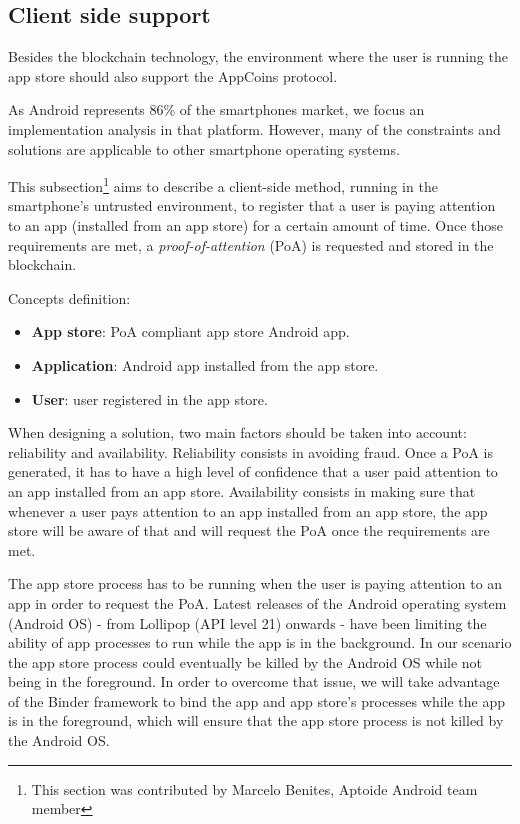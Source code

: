 \subsection{Client side support}

Besides the blockchain technology, the environment where the user is running the app store should 
also support the AppCoins protocol.


As Android represents 86\% of the smartphones market, we focus an implementation analysis in that 
platform. However, many of the constraints and solutions are applicable to other smartphone operating systems.

This subsection\footnote{This section was contributed by Marcelo Benites, Aptoide Android team 
member} aims to describe a client-side method, running in the smartphone's untrusted environment, to 
register that a user is paying attention to an app (installed from an app store) for a certain amount of time. Once those requirements are met, a \textit{proof-of-attention} (\textsf{PoA}) is requested and stored in the 
blockchain.
 
 
Concepts definition: %
\begin{itemize}
\item {\bf App store}: PoA compliant app store Android app.
\item {\bf Application}: Android app installed from the app store.
\item {\bf User}: user registered in the app store.
\end{itemize}

When designing a solution, two main factors should be taken into account: reliability and availability. 
Reliability consists in avoiding fraud. Once a \textsf{PoA} is generated, it has to have a high level of 
confidence that a user paid attention to an app installed from an app store. Availability consists in 
making sure that whenever a user pays attention to an app installed from an app store, the app store 
will be aware of that and will request the \textsf{PoA} once the requirements are met. %

The app store process has to be running when the user is paying attention to an app in order to request  
the \textsf{PoA}. Latest releases of the Android operating system (Android OS) - from Lollipop (API 
level 21) onwards - have been limiting the ability of app processes to run while the app is in the 
background. In our scenario the app store process could eventually be killed by the Android OS while 
not being in the foreground. In order to overcome that issue, we will take advantage of the Binder 
framework to bind the app and app store's processes while the app is in the foreground, which will 
ensure that the app store process is not killed by the Android OS. 

